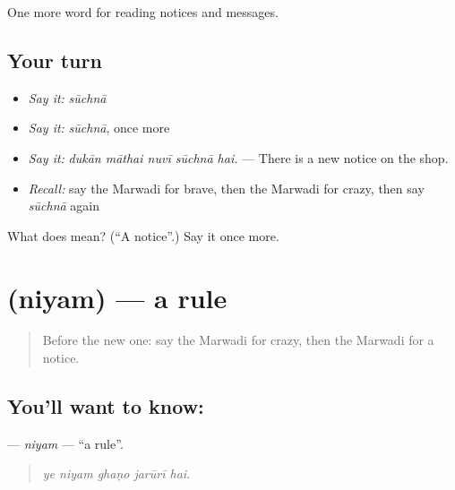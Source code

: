 \begin{grammarlens}[title={What you've built}]
One more word for reading notices and messages.
\end{grammarlens}

\subsection*{Your turn}
\begin{itemize}
\raggedright
  \item \emph{Say it:} \emph{sūchnā}
  \item \emph{Say it:} \emph{sūchnā}, once more
  \item \emph{Say it:} \emph{dukān māthai nuvī sūchnā hai.} — There is a new notice on the shop.
  \item \emph{Recall:} say the Marwadi for brave, then the Marwadi for crazy, then say \emph{sūchnā} again
\end{itemize}

\begin{tcolorbox}[breakable,colback=teal!4,colframe=teal!35!black,title={Before you move on}]
What does  mean? (\textquotedblleft{}A notice\textquotedblright{}.) Say it once more.
\end{tcolorbox}
\section[\texorpdfstring{\mw{नियम} (niyam)}{नियम (niyam)}]{ (niyam) — a rule}

\label{lesson:MW-C191-niyam}



\begin{quote}
Before the new one: say the Marwadi for crazy, then the Marwadi for a notice.
\end{quote}

\subsection*{You'll want to know: }
\textbf{} — \emph{niyam} — \textquotedblleft{}a rule\textquotedblright{}.

\begin{quote}
    
\end{quote}

\begin{quote}
\emph{ye niyam ghaṇo jarūrī hai.}
\end{quote}


